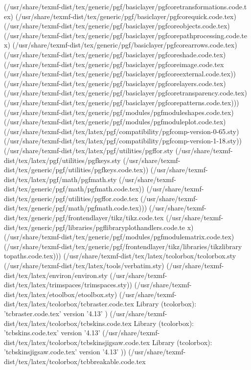 (/usr/share/texmf-dist/tex/generic/pgf/basiclayer/pgfcoretransformations.code.t
ex) (/usr/share/texmf-dist/tex/generic/pgf/basiclayer/pgfcorequick.code.tex)
(/usr/share/texmf-dist/tex/generic/pgf/basiclayer/pgfcoreobjects.code.tex)
(/usr/share/texmf-dist/tex/generic/pgf/basiclayer/pgfcorepathprocessing.code.te
x) (/usr/share/texmf-dist/tex/generic/pgf/basiclayer/pgfcorearrows.code.tex)
(/usr/share/texmf-dist/tex/generic/pgf/basiclayer/pgfcoreshade.code.tex)
(/usr/share/texmf-dist/tex/generic/pgf/basiclayer/pgfcoreimage.code.tex
(/usr/share/texmf-dist/tex/generic/pgf/basiclayer/pgfcoreexternal.code.tex))
(/usr/share/texmf-dist/tex/generic/pgf/basiclayer/pgfcorelayers.code.tex)
(/usr/share/texmf-dist/tex/generic/pgf/basiclayer/pgfcoretransparency.code.tex)
 (/usr/share/texmf-dist/tex/generic/pgf/basiclayer/pgfcorepatterns.code.tex)))
(/usr/share/texmf-dist/tex/generic/pgf/modules/pgfmoduleshapes.code.tex)
(/usr/share/texmf-dist/tex/generic/pgf/modules/pgfmoduleplot.code.tex)
(/usr/share/texmf-dist/tex/latex/pgf/compatibility/pgfcomp-version-0-65.sty)
(/usr/share/texmf-dist/tex/latex/pgf/compatibility/pgfcomp-version-1-18.sty))
(/usr/share/texmf-dist/tex/latex/pgf/utilities/pgffor.sty
(/usr/share/texmf-dist/tex/latex/pgf/utilities/pgfkeys.sty
(/usr/share/texmf-dist/tex/generic/pgf/utilities/pgfkeys.code.tex))
(/usr/share/texmf-dist/tex/latex/pgf/math/pgfmath.sty
(/usr/share/texmf-dist/tex/generic/pgf/math/pgfmath.code.tex))
(/usr/share/texmf-dist/tex/generic/pgf/utilities/pgffor.code.tex
(/usr/share/texmf-dist/tex/generic/pgf/math/pgfmath.code.tex)))
(/usr/share/texmf-dist/tex/generic/pgf/frontendlayer/tikz/tikz.code.tex
(/usr/share/texmf-dist/tex/generic/pgf/libraries/pgflibraryplothandlers.code.te
x) (/usr/share/texmf-dist/tex/generic/pgf/modules/pgfmodulematrix.code.tex)
(/usr/share/texmf-dist/tex/generic/pgf/frontendlayer/tikz/libraries/tikzlibrary
topaths.code.tex))) (/usr/share/texmf-dist/tex/latex/tcolorbox/tcolorbox.sty
(/usr/share/texmf-dist/tex/latex/tools/verbatim.sty)
(/usr/share/texmf-dist/tex/latex/environ/environ.sty
(/usr/share/texmf-dist/tex/latex/trimspaces/trimspaces.sty))
(/usr/share/texmf-dist/tex/latex/etoolbox/etoolbox.sty)
(/usr/share/texmf-dist/tex/latex/tcolorbox/tcbraster.code.tex
Library (tcolorbox): 'tcbraster.code.tex' version '4.13'
) (/usr/share/texmf-dist/tex/latex/tcolorbox/tcbskins.code.tex
Library (tcolorbox): 'tcbskins.code.tex' version '4.13'
(/usr/share/texmf-dist/tex/latex/tcolorbox/tcbskinsjigsaw.code.tex
Library (tcolorbox): 'tcbskinsjigsaw.code.tex' version '4.13'
)) (/usr/share/texmf-dist/tex/latex/tcolorbox/tcbbreakable.code.tex
